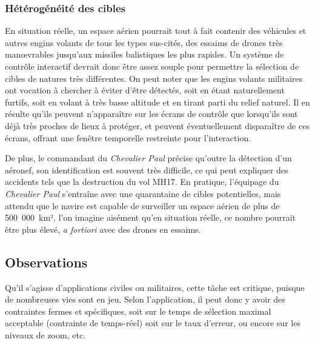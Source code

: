 	
	\subsubsection{Hétérogénéité des cibles}
	En situation réelle, un espace aérien pourrait tout à fait contenir des véhicules et autres engins volants de tous les types sus-cités, des essaims de drones très manœvrables jusqu'aux missiles balistiques les plus rapides. Un système de contrôle interactif devrait donc être assez souple pour permettre la sélection de cibles de natures très différentes.
	On peut noter que les engins volants militaires ont vocation à chercher à éviter d'être détectés, soit en étant naturellement furtifs, soit en volant à très basse altitude et en tirant parti du relief naturel. Il en résulte qu'ils peuvent n'apparaître sur les écrans de contrôle que lorsqu'ils sont déjà très proches de lieux à protéger, et peuvent éventuellement disparaître de ces écrans, offrant une fenêtre temporelle restreinte pour l'interaction.
	
	De plus, le commandant du \emph{Chevalier Paul}\footnotemark{} précise qu'outre la détection d'un aéronef, son identification est souvent très difficile, ce qui peut expliquer des accidents tels que la destruction du vol MH17\footnotemark{}. En pratique, l'équipage du \emph{Chevalier Paul} s'entraîne avec une quarantaine de cibles potentielles, mais attendu que le navire est capable de surveiller un espace aérien de plus de 500~000~km², l'on imagine aisément qu'en situation réelle, ce nombre pourrait être plus élevé, \emph{a fortiori} avec des drones en essaims.
	
	\addtocounter{footnote}{-1}
	\addtocounter{footnote}{1}
	
	\FloatBarrier \subsection{Observations}
	Qu'il s'agisse d'applications civiles ou militaires, cette tâche est critique, puisque de nombreuses vies sont en jeu. Selon l'application, il peut donc y avoir des contraintes fermes et spécifiques, soit sur le temps de sélection maximal acceptable (contrainte de temps-réel) soit sur le taux d'erreur, ou encore sur les niveaux de zoom, etc.


